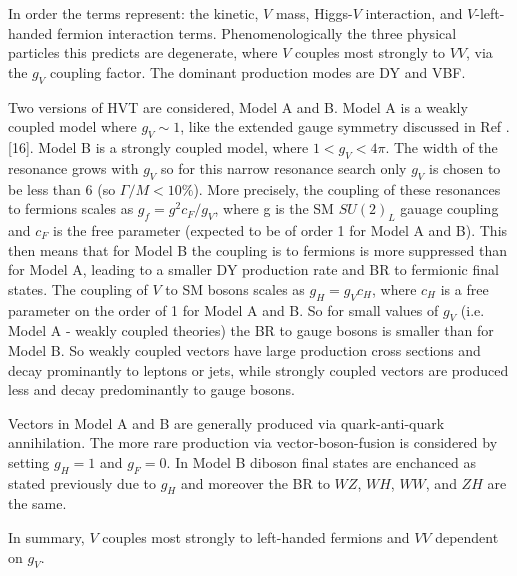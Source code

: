 In order the terms represent: the kinetic, $V$ mass, Higgs-$V$ interaction, and $V$-left-handed fermion interaction terms. Phenomenologically the three physical particles this predicts are degenerate, where $V$ couples most strongly to $VV$, via the $g_{V}$ coupling factor. The dominant production modes are DY and VBF. 

Two versions of HVT are considered, Model A and B. Model A is  a weakly coupled model where $g_{V} \sim 1$, like the extended gauge symmetry discussed in Ref . [16]. Model B is a strongly coupled model, where $1<g_{V}<4\pi$. The width of the resonance grows with $g_{V}$ so for this narrow resonance search only $g_{V}$ is chosen to be less than 6 (so $\Gamma / M < 10\%$). More precisely, the coupling of these resonances to fermions scales as $g_{f} = g^{2}c_{F}/g_{V}$, where g is the SM $SU(2)_{L}$ gauage coupling and $c_{F}$ is the free parameter (expected to be of order 1 for Model A and B). This then means that for Model B the coupling is to fermions is more suppressed than for Model A, leading to a smaller DY production rate and BR to fermionic final states. The coupling of $V$ to SM bosons scales as $g_{H}=g_{V}c_{H}$, where $c_{H}$ is a free parameter on the order of 1 for Model A and B. So for small values of $g_{V}$ (i.e. Model A - weakly coupled theories) the BR to gauge bosons is smaller than for Model B. So weakly coupled vectors have large production cross sections and decay prominantly to leptons or jets, while strongly coupled vectors are produced less and decay predominantly to gauge bosons. 

Vectors in Model A and B are generally produced via quark-anti-quark annihilation. The more rare production via vector-boson-fusion is considered by setting $g_{H} = 1$ and $g_{F}=0$. In Model B diboson final states are enchanced as stated previously due to $g_{H}$ and moreover the BR to $WZ$, $WH$, $WW$, and $ZH$ are the same.

In summary, $V$ couples most strongly to left-handed fermions and $VV$ dependent on $g_{V}$. 
